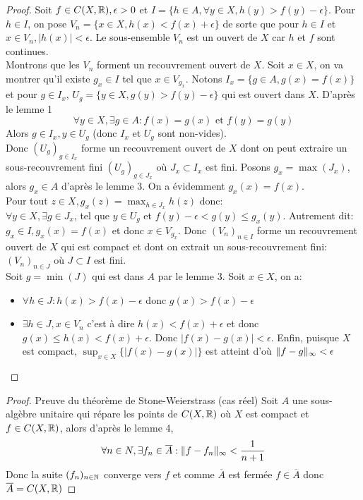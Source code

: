 \documentclass[]{report}
\begin{document}
    \begin{proof}
        Soit $f\in C(X,\mathbb{R}),\epsilon>0$ et $I=\{h\in A,\forall y\in X,h(y)>f(y)-\epsilon\}$. Pour $h\in I$, on pose $V_n=\{x\in X,h(x)<f(x)+\epsilon\}$ de sorte que pour $h\in I$ et $x\in V_n,|h(x)|<\epsilon$. Le sous-ensemble $V_n$ est un ouvert de $X$ car $h$ et $f$ sont continues.\\
        Montrons que les $V_n$ forment un recouvrement ouvert de $X$. Soit $x\in X$, on va montrer qu'il existe $g_x\in I$ tel que $x\in V_{g_x}$. Notons $I_x=\{g\in A,g(x)=f(x)\}$ et pour $g\in I_x$, $U_g=\{y\in X,g(y)>f(y)-\epsilon\}$ qui est ouvert dans $X$. D'après le lemme 1
        \[\forall y\in X,\exists g\in A:f(x)=g(x)\text{ et }f(y)=g(y)\]
        Alors $g\in I_x,y\in U_g$ (donc $I_x$ et $U_g$ sont non-vides).\\
        Donc $(U_g)_{g\in I_x}$ forme un recouvrement ouvert de $X$ dont on peut extraire un sous-recouvrement fini $(U_g)_{g\in J_x}$ où $J_x\subset I_x$ est fini. Posons $g_x=\max(J_x)$, alors $g_x\in A$ d'après le lemme 3. On a évidemment $g_x(x)=f(x)$.\\
        Pour tout $z\in X, g_x(z)=\max_{h\in J_x} h(z)$ donc:\\
        $\forall y\in X,\exists g\in J_x$, tel que $y\in U_g$ et $f(y)-\epsilon<g(y)\le g_x(y)$. Autrement dit: $g_x\in I, g_x(x)=f(x)$ et donc $x\in V_{g_x}$. Donc $(V_n)_{n\in I}$ forme un recouvrement ouvert de $X$ qui est compact et dont on extrait un sous-recouvrement fini: $(V_n)_{n\in J}$ où $J\subset I$ est fini.\\
        Soit $g=\min (J)$ qui est dans $A$ par le lemme 3. Soit $x\in X$, on a:
        \begin{itemize}
            \item $\forall h\in J: h(x)>f(x)-\epsilon$ donc $g(x)>f(x)-\epsilon$
            \item $\exists h\in J, x\in V_n$ c'est à dire $h(x)<f(x)+\epsilon$ et donc $g(x)\le h(x)<f(x)+\epsilon$. Donc $|f(x)-g(x)|<\epsilon$. Enfin, puisque $X$ est compact, $\sup_{x\in X}\{|f(x)-g(x)|\}$ est atteint d'où $\lVert f-g \rVert_\infty<\epsilon$
        \end{itemize}
    \end{proof}

    \begin{proof}{Preuve du théorème de Stone-Weierstrass (cas réel)}{}
        Soit $A$ une sous-algèbre unitaire qui répare les points de $C(X,\mathbb{R})$ où $X$ est compact et $f\in C(X,\mathbb{R})$, alors d'après le lemme 4,
        \[\forall n\in N,\exists f_n\in \overline{A}:\lVert f-f_n \rVert_\infty<\frac{1}{n+1}\]
        Donc la suite $(f_n)_{n\in\mathbb{N}}$ converge vers $f$ et comme $\overline{A}$ est fermée $f\in \overline{A}$ donc $\overline{A}=C(X,\mathbb{R})$
    \end{proof}
\end{document}
